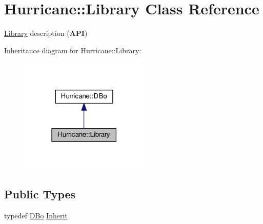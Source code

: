 \hypertarget{classHurricane_1_1Library}{}\section{Hurricane\+:\+:Library Class Reference}
\label{classHurricane_1_1Library}


\mbox{\hyperlink{classHurricane_1_1Library}{Library}} description ({\bfseries A\+PI})  




Inheritance diagram for Hurricane\+:\+:Library\+:\nopagebreak
\begin{figure}[H]
\begin{center}
\leavevmode
\includegraphics[width=174pt]{classHurricane_1_1Library__inherit__graph}
\end{center}
\end{figure}
\subsection*{Public Types}
\begin{DoxyCompactItemize}
\item 
typedef \mbox{\hyperlink{classHurricane_1_1DBo}{D\+Bo}} \mbox{\hyperlink{classHurricane_1_1Library_a30ef446b2da0d405bdf4e11ce67b160f}{Inherit}}
\end{DoxyCompactItemize}
